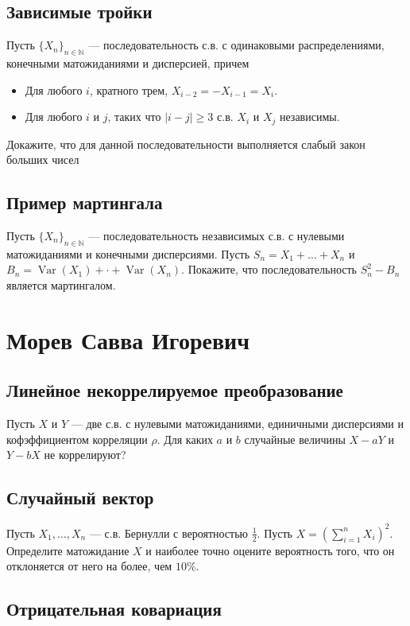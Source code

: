 \documentclass[12pt]{article}
\newcommand\N{\mathbb{N}}
\DeclareMathOperator{\Var}{Var}
\begin{document}
\subsection{Зависимые тройки}
Пусть $\{X_n\}_{n \in \N}$ --- последовательность с.в. с одинаковыми распределениями, конечными матожиданиями и дисперсией, причем
\begin{itemize}
    \item Для любого $i$, кратного трем, $X_{i - 2} = - X_{i - 1} = X_{i}$. 
    \item Для любого $i$ и $j$, таких что $|i - j| \ge 3$ с.в. $X_i$ и $X_j$ независимы.
\end{itemize}
Докажите, что для данной последовательности выполняется слабый закон больших чисел


\subsection{Пример мартингала}

Пусть $\{X_n\}_{n \in \N}$ --- последовательность независимых с.в. с нулевыми матожиданиями и конечными дисперсиями. Пусть $S_n = X_1 + \dots + X_n$ и $B_n = \Var(X_1) + \cdot + \Var(X_n)$. Покажите, что последовательность $S_n^2 - B_n$ является мартингалом.


\newpage
\section{Морев Савва Игоревич}

\subsection{Линейное некоррелируемое преобразование}

Пусть $X$ и $Y$ --- две с.в. с нулевыми матожиданиями, единичными дисперсиями и кофэффициентом корреляции $\rho$. Для каких $a$ и $b$ случайные величины $X - aY$ и $Y - bX$ не коррелируют?


\subsection{Случайный вектор}

Пусть $X_1, \dots, X_n$ --- с.в. Бернулли с вероятностью $\frac{1}{2}$. Пусть $X = (\sum_{i = 1}^n X_i)^2$. Определите матожидание $X$ и наиболее точно оцените вероятность того, что он отклоняется от него на более, чем $10\%$.


\subsection{Отрицательная ковариация}
\end{document}
